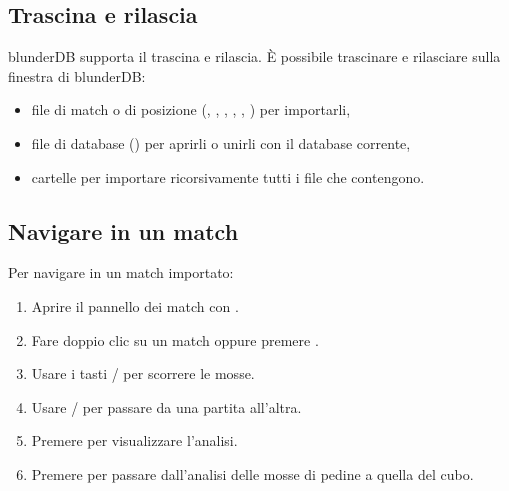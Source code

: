\documentclass[letterpaper,10pt,italian]{sphinxmanual}
\begin{document}
\subsection{Trascina e rilascia}
\label{\detokenize{guide_utilisateur:glisser-deposer}}
\sphinxAtStartPar
blunderDB supporta il trascina e rilascia. È possibile trascinare e rilasciare sulla finestra di blunderDB:
\begin{itemize}
\item {} 
\sphinxAtStartPar
file di match o di posizione (, , , , , ) per importarli,

\item {} 
\sphinxAtStartPar
file di database () per aprirli o unirli con il database corrente,

\item {} 
\sphinxAtStartPar
cartelle per importare ricorsivamente tutti i file che contengono.

\end{itemize}


\subsection{Navigare in un match}
\label{\detokenize{guide_utilisateur:naviguer-dans-un-match}}
\sphinxAtStartPar
Per navigare in un match importato:
\begin{enumerate}
%
\item {} 
\sphinxAtStartPar
Aprire il pannello dei match con .

\item {} 
\sphinxAtStartPar
Fare doppio clic su un match oppure premere .

\item {} 
\sphinxAtStartPar
Usare i tasti  /  per scorrere le mosse.

\item {} 
\sphinxAtStartPar
Usare  /  per passare da una partita all’altra.

\item {} 
\sphinxAtStartPar
Premere  per visualizzare l’analisi.

\item {} 
\sphinxAtStartPar
Premere  per passare dall’analisi delle mosse di pedine a quella del cubo.

\end{enumerate}
\end{document}
